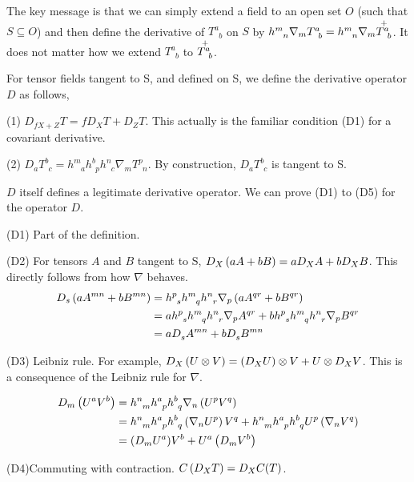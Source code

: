  

The key message is that we can simply extend a field to an open set $O$ (such that $S \subseteq O$) and then define the derivative of $T^a_{\phantom{a}b}$ on $S$ by $ \tt{h}{m}{n}\cov{T^a_{\phantom{a}b}}{m} = h^m_{\phantom{m}n} \nabla_m  \overset{+}{ \tt{T}{a}{b}}$. It does not matter how we extend $T^a_{\phantom{a}b}$ to $\overset{+}{\tt{T}{a}{b}}$.

For tensor fields tangent to S, and defined on S, we define the derivative operator $D$ as follows,

(1) $ D_{fX+Z} T = f D_X T+ D_Z T$. This actually is the familiar condition (D1) for a covariant derivative.

(2) $D_a T^b_{\phantom{b}c} = h^m_{\phantom{m}a} h^b_{\phantom{b}p} h^n_{\phantom{n}c} \nabla_m  T^p_{\phantom{p}n} $. By construction, $D_a T^b_{\phantom{b}c}$ is tangent to S.


 $D$ itself defines a legitimate derivative operator. We can prove (D1) to (D5) for the operator $ D$.

(D1) Part of the definition.

(D2) For tensors $ A$ and $ B$ tangent to S, $ D_X \left(  a A+ bB \right)= a D_X A + b D_X B $. This directly follows from how $ \nabla$ behaves.
\begin{align*}
    D_s \lera{aA^{mn} + bB^{mn}} &=  \tt{h}{p}{s} \tt{h}{m}{q} \tt{h}{n}{r} \nabla_p \lera{ aA^{qr}+bB^{qr}}\\
   &= a \tt{h}{p}{s} \tt{h}{m}{q} \tt{h}{n}{r} \nabla_p A^{qr}+ b \tt{h}{p}{s} \tt{h}{m}{q} \tt{h}{n}{r} \nabla_p B^{qr} \\
   &= a \tt{D}{}{s} \tt{A}{mn}{} + b \tt{D}{}{s} \tt{B}{mn}{} 
\end{align*}

(D3) Leibniz rule. For example,  $D_X \left( U \otimes V \right) = \left( D_X U \right) \otimes V + U \otimes D_X V$. This is a consequence of the Leibniz rule for $ \nabla$. 

\begin{align*}
    D_m \left( U^a V^b \right) &=  h^n_{\phantom{n}m} h^a_{\phantom{a}p} h^b_{\phantom{b}q} \nabla_n \left(  U^p V^q \right) \\
    &= h^n_{\phantom{n}m} h^a_{\phantom{a}p} h^b_{\phantom{b}q} \left( \nabla_n  U^p \right)  V^q + h^n_{\phantom{n}m} h^a_{\phantom{a}p} h^b_{\phantom{b}q} U^p \left( \nabla_n  V^q \right)   \\
    &= (D_m U^a)  V^b + U^a \left(  D_m V^b \right) 
\end{align*}

(D4)Commuting with contraction. $C\left( D_X T \right) = D_X C(T) $.

